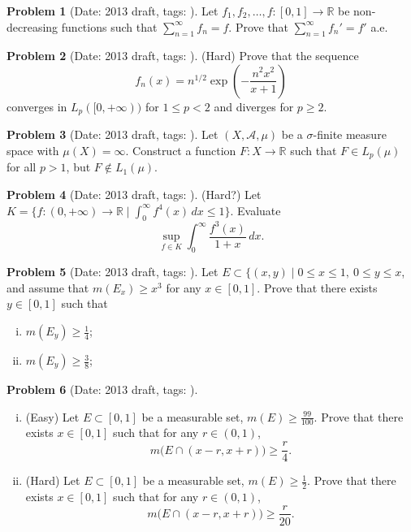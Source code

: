 \documentclass[11pt, notitlepage]{article}
\theoremstyle{definition}
\theoremstyle{definition}
\theoremstyle{definition}
\newtheorem{probstate}{Problem}
\theoremstyle{remark}
\newenvironment{problem}[2]{
    \begin{probstate}[Date: #1, tags: \texttt{#2}]
}
{
  \end{probstate}
}
\newcommand{\R}{\mathbb{R}}
\begin{document}
\begin{problem}{2013 draft}{}
Let $f_1, f_2, \ldots,f: [0,1] \to \R$ be non-decreasing functions such that $\sum_{n=1}^{\infty} f_n =f$. Prove that $\sum_{n=1}^{\infty} f_n' =f'$ a.e.
\end{problem}

\begin{problem}{2013 draft}{}
(Hard) Prove that the sequence
    \[
     f_n(x)= n^{1/2} \exp \left(- \frac{n^2x^2}{x+1} \right)
    \]
    converges in $L_p([0,+\infty))$ for $1 \le p<2$ and diverges for $p \ge 2$.
\end{problem}

\begin{problem}{2013 draft}{}
Let  $(X, \mathcal{A},\mu)$ be a $\sigma$-finite measure space with $\mu(X)=\infty$. Construct a function $F: X \to \R$ such that $F \in L_p(\mu)$ for all $p>1$, but $F \notin L_1(\mu)$.
\end{problem}

\begin{problem}{2013 draft}{}
(Hard?) Let $K=\{f :(0,+\infty) \to \R \mid \int_0^{\infty} f^4(x) \, dx \le 1  \}$. Evaluate
\[
  \sup_{f \in K} \int_0^\infty \frac{f^3(x)}{1+x}  \, dx.
\]
\end{problem}

\begin{problem}{2013 draft}{}
Let $E \subset \{(x,y) \mid 0 \le x \le 1, \ 0 \le y \le x$, and assume that $m(E_x) \ge x^3$ for any $x \in [0,1]$. Prove that there exists $y \in [0,1]$ such that
\begin{enumerate}[(i)]
 \item $m(E_y) \ge \frac{1}{4}$;
 \item $m(E_y) \ge \frac{3}{8}$;
\end{enumerate}
\end{problem}

\begin{problem}{2013 draft}{}
\begin{enumerate}[(i)]
   \item (Easy) Let $E \subset [0,1]$ be a measurable set, $m(E) \ge \frac{99}{100}$. Prove that there exists $x \in [0,1]$ such that for any $r \in (0,1)$,
    \[
      m \big( E \cap (x-r,x+r) \big) \ge \frac{r}{4}.
    \]
    \item (Hard) Let $E \subset [0,1]$ be a measurable set, $m(E) \ge \frac{1}{2}$. Prove that there exists $x \in [0,1]$ such that for any $r \in (0,1)$,
    \[
      m \big(E \cap (x-r,x+r) \big) \ge \frac{r}{20}.
    \]
\end{enumerate}
\end{problem}
\end{document}
